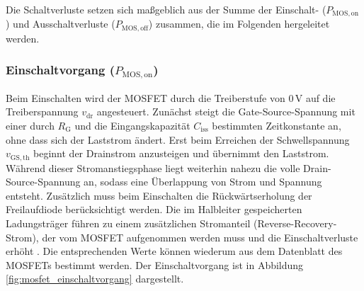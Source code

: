 Die Schaltverluste setzen sich maßgeblich aus der Summe der Einschalt- ($P_{\mathrm{MOS,on}}$) und Ausschaltverluste ($P_{\mathrm{MOS,off}}$) zusammen, die im Folgenden hergeleitet werden.

\subsubsection*{Einschaltvorgang ($P_{\mathrm{MOS,on}}$)}
Beim Einschalten wird der MOSFET durch die Treiberstufe von $0\,\mathrm{V}$ auf die Treiberspannung $v_\mathrm{dr}$ angesteuert. Zunächst steigt die Gate-Source-Spannung mit einer durch $R_\mathrm{G}$ und die Eingangskapazität $C_{\mathrm{iss}}$ bestimmten Zeitkonstante an, ohne dass sich der Laststrom ändert. Erst beim Erreichen der Schwellspannung $v_{\mathrm{GS,th}}$ beginnt der Drainstrom anzusteigen und übernimmt den Laststrom.
Während dieser Stromanstiegsphase liegt weiterhin nahezu die volle Drain-Source-Spannung an, sodass eine Überlappung von Strom und Spannung entsteht. Zusätzlich muss beim Einschalten die Rückwärtserholung der Freilaufdiode berücksichtigt werden. Die im Halbleiter gespeicherten Ladungsträger führen zu einem zusätzlichen Stromanteil (Reverse-Recovery-Strom), der vom MOSFET aufgenommen werden muss und die Einschaltverluste erhöht \cite[S.~6]{Infineon_MOSFET_Losses}. Die entsprechenden Werte können wiederum aus dem Datenblatt des MOSFETs bestimmt werden. Der Einschaltvorgang ist in Abbildung \ref{fig:mosfet_einschaltvorgang} dargestellt.

